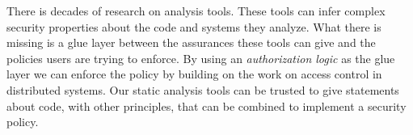 \documentclass[report.tex]{subfiles}
\begin{document}
There is decades of research on analysis tools.  These tools can infer complex
security properties about the code and systems they analyze.  What there is
missing is a glue layer between the assurances these tools can give and the
policies users are trying to enforce.  By using an \emph{authorization logic} as
the glue layer we can enforce the policy by building on the work on access
control in distributed systems.  Our static analysis tools can be trusted to
give statements about code, with other principles, that can be combined to
implement a security policy.
\end{document}
